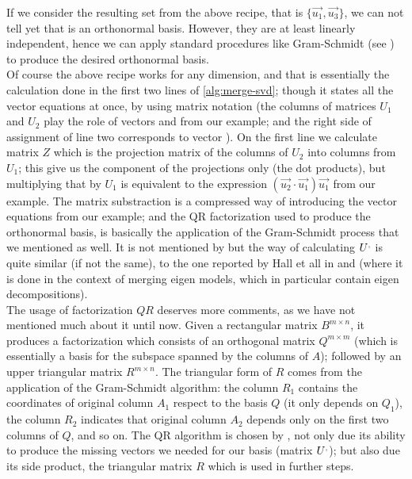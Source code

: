 If we consider the resulting set from the above recipe, that is $\{\vec{u_1},
\vec{u_3}\}$, we can not tell yet that is an orthonormal
basis. However, they are at least linearly independent, hence we can
apply standard procedures like Gram-Schmidt (see \cite{strang88}) to
produce the desired orthonormal basis. \\


Of course the above recipe works for any dimension, and that is
essentially the calculation done in the first two lines of
\cref{alg:merge-svd}; though it 
states all the vector equations at once, by using matrix
notation (the columns of matrices $U_1$ and $U_2$ play the role of
vectors  and  from our example; and the right side
of assignment of line two corresponds to vector ). On the
first line we calculate matrix $Z$ which is the projection matrix of
the columns of $U_2$ into columns from $U_1$; this give us the
component of the projections only (the dot products), but multiplying
that by $U_1$ is equivalent to the expression $(\vec{u_2} \cdot
\vec{u_1}) \vec{u_1}$ from our example. The matrix
substraction is a compressed way of introducing the vector equations
from our example; and the QR factorization used to produce the
orthonormal basis, is basically the application of the Gram-Schmidt
process that we mentioned as well. It is not mentioned by
\cite{rehurek11a} but the way of calculating 
$\prim{U}$ is quite similar (if not the same), to the one reported by
Hall et all in \cite{hall00} and \cite{hall02} (where it is done in
the context of merging eigen models, which in particular contain eigen
decompositions). \\

The usage of factorization $QR$ deserves more comments, as we have not
mentioned much about it until now. Given a rectangular matrix $B^{m
  \times n}$, it produces a factorization which consists of an
  orthogonal matrix $Q^{m \times m}$ (which is essentially a basis
  for the subspace spanned by the columns of $A$); followed by an
  upper triangular matrix $R^{m \times 
    n}$. The triangular form of $R$ 
  comes from the application of the Gram-Schmidt algorithm: the column
  $R_1$ contains the coordinates of original column $A_1$ respect to
  the basis $Q$ (it only depends on $Q_1$), the column $R_2$ indicates
  that original column $A_2$ depends only on the first two columns of
  $Q$, and so on. The QR algorithm is chosen by \Rehurek, not only due
  its ability to produce the missing vectors we needed for our basis
  (matrix $\prim{U}$); but also due its side product, the triangular matrix
  $R$ which is used in further steps.

